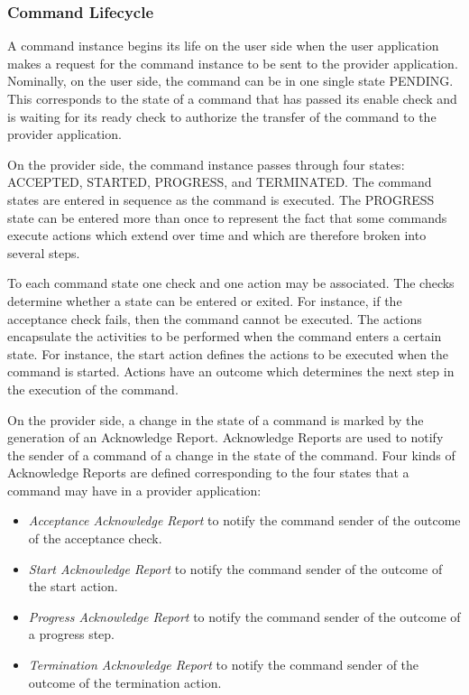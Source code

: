 \subsubsection{Command Lifecycle}\label{sec:CmdLifecycle}
A command instance begins its life on the user side when the user application makes a request for the command instance to be sent to the provider application. Nominally, on the user side, the command can be in one single state PENDING. This corresponds to the state of a command that has passed its enable check and is waiting for its ready check to authorize the transfer of the command to the provider application. 

On the provider side, the command instance passes through four states: ACCEPTED, STARTED, PROGRESS, and TERMINATED. The command states are entered in sequence as the command is executed. The PROGRESS state can be entered more than once to represent the fact that some commands execute actions which extend over time and which are therefore broken into several steps.

To each command state one check and one action may be associated. The checks determine whether a state can be entered or exited. For instance, if the acceptance check fails, then the command cannot be executed. The actions encapsulate the activities to be performed when the command enters a certain state. For instance, the start action defines the actions to be executed when the command is started. Actions have an outcome which determines the next step in the execution of the command.

On the provider side, a change in the state of a command is marked by the generation of an Acknowledge Report. Acknowledge Reports are used to notify the sender of a command of a change in the state of the command. Four kinds of Acknowledge Reports are defined corresponding to the four states that a command may have in a provider application:

\begin{itemize}
\item \textit{Acceptance Acknowledge Report} to notify the command sender of the outcome of the acceptance check.
\item \textit{Start Acknowledge Report} to notify the command sender of the outcome of the start action.
\item \textit{Progress Acknowledge Report} to notify the command sender of the outcome of a progress step.
\item \textit{Termination Acknowledge Report} to notify the command sender of the outcome of the termination action.
\end{itemize}

